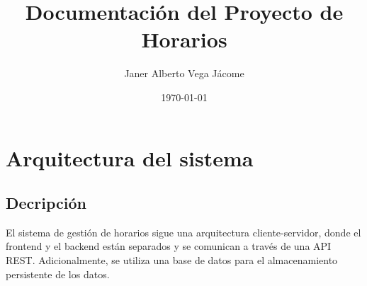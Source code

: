 \documentclass{article} %
\title{Documentación del Proyecto de Horarios}
\author{Janer Alberto Vega Jácome}
\date{\today}
\begin{document}
\maketitle %

    \section{Arquitectura del sistema}
    \subsection{Decripción}
    \noindent El sistema de gestión de horarios sigue una arquitectura cliente-servidor, donde el frontend y el backend están separados y se comunican a través de una API REST. Adicionalmente, se utiliza una base de datos para el almacenamiento persistente de los datos.
    
\end{document}
